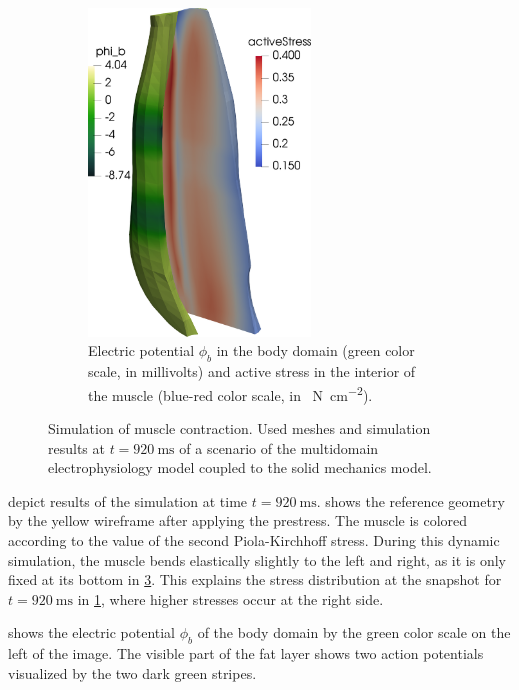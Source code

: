 \begin{figure}
\begin{subfigure}[t]{0.31\textwidth}
    \label{fig:multidomain_prestretch6}%
  \end{subfigure}\qquad
  \begin{subfigure}[t]{0.31\textwidth}%
    \centering%
    \includegraphics[height=87mm]{images/results/application/multidomain_prestretch2.png}%
    \caption{Electric potential $\phi_b$ in the body domain (green color scale, in millivolts) and active stress in the interior of the muscle (blue-red color scale, in \SI{}{\newton\per\centi\meter\squared}).}%
    \label{fig:multidomain_prestretch2}%
  \end{subfigure}
  \hfill
  \caption{Simulation of muscle contraction. Used meshes and simulation results at $t=\SI{920}{\ms}$ of a scenario of the multidomain electrophysiology model coupled to the solid mechanics model.}%
  \label{fig:multidomain_prestretch}%
\end{figure}%

 depict results of the simulation at time $t=\SI{920}{\milli\second}$. 
 shows the reference geometry by the yellow wireframe after applying the prestress. The muscle is colored according to the value of the second Piola-Kirchhoff stress. During this dynamic simulation, the muscle bends elastically slightly to the left and right, as it is only fixed at its bottom in \cref{fig:multidomain_prestretch}. This explains the stress distribution at the snapshot for $t=\SI{920}{\milli\second}$ in \cref{fig:multidomain_prestretch6}, where higher stresses occur at the right side.

 shows the electric potential $\phi_b$ of the body domain by the green color scale on the left of the image. The visible part of the fat layer shows two action potentials visualized by the two dark green stripes.

